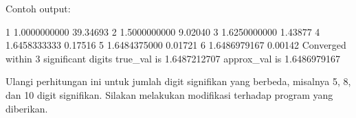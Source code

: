 Contoh output:
\begin{textcode}
  1       1.0000000000   39.34693%
  2       1.5000000000    9.02040%
  3       1.6250000000    1.43877%
  4       1.6458333333    0.17516%
  5       1.6484375000    0.01721%
  6       1.6486979167    0.00142%
Converged within 3 significant digits
true_val   is       1.6487212707
approx_val is       1.6486979167
\end{textcode}


\begin{soal}
Ulangi perhitungan ini untuk jumlah digit signifikan yang berbeda, misalnya 5, 8, dan 10
digit signifikan. Silakan melakukan modifikasi terhadap program yang diberikan.
\end{soal}